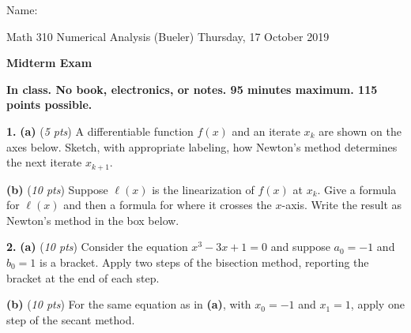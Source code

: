 \documentclass[11pt]{amsart}
\newcommand{\prob}[1]{\bigskip\noindent\textbf{#1.} }
\newcommand{\pts}[1]{(\emph{#1 pts})}
\newcommand{\ppartpts}[2]{\textbf{(#1)} \pts{#2} \quad}
\newcommand{\epartpts}[2]{\medskip\noindent \textbf{(#1)} \pts{#2} \quad}
\begin{document}
\hfill \Large Name:\underline{\phantom{Ed Bueler really really long long long name}}
\medskip

\scriptsize \noindent Math 310 Numerical Analysis (Bueler) \hfill Thursday, 17 October 2019
\medskip

\Large\centerline{\textbf{Midterm Exam}}

\smallskip
\large
\begin{center}
\textbf{In class.  No book, electronics, or notes.  95 minutes maximum.  115 points possible.}
\end{center}

\medskip

\thispagestyle{empty}

\prob{1}  \ppartpts{a}{5}  A differentiable function $f(x)$ and an iterate $x_k$ are shown on the axes below.  Sketch, with appropriate labeling, how Newton's method determines the next iterate $x_{k+1}$.

\begin{center}
\end{center}

\medskip

\epartpts{b}{10} Suppose $\ell(x)$ is the linearization of $f(x)$ at $x_k$.  Give a formula for $\ell(x)$ and then a formula for where it crosses the $x$-axis.  Write the result as Newton's method in the box below.

\vfill

\qquad {}

\bigskip

\newpage
\prob{2} \ppartpts{a}{10}  Consider the equation $x^3 - 3x + 1 = 0$ and suppose $a_0=-1$ and $b_0=1$ is a bracket.  Apply two steps of the bisection method, reporting the bracket at the end of each step.
\vfill

\epartpts{b}{10}  For the same equation as in \textbf{(a)}, with $x_0=-1$ and $x_1=1$, apply one step of the secant method.
\vfill
\end{document}
